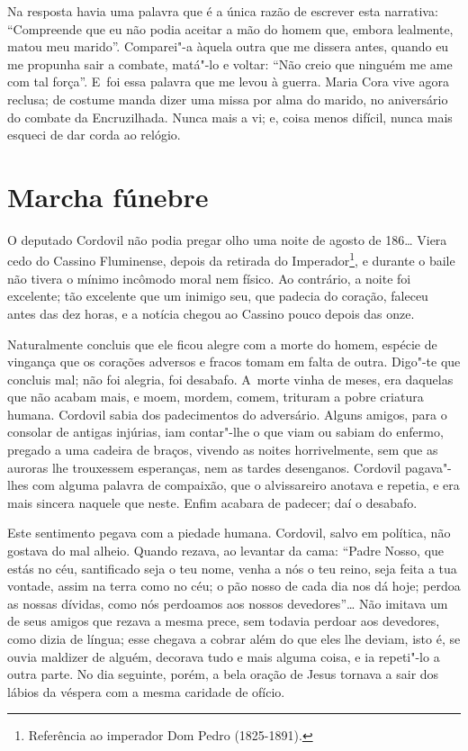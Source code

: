 Na resposta havia uma palavra que é a única razão de escrever esta
narrativa: ``Compreende que eu não podia aceitar a mão do homem que,
embora lealmente, matou meu marido''. Comparei"-a àquela outra que me
dissera antes, quando eu me propunha sair a combate, matá"-lo e voltar:
``Não creio que ninguém me ame com tal força''. E~foi essa palavra que
me levou à guerra. Maria Cora vive agora reclusa; de costume manda dizer
uma missa por alma do marido, no aniversário do combate da Encruzilhada.
Nunca mais a vi; e, coisa menos difícil, nunca mais esqueci de dar corda
ao relógio.

\chapter{Marcha fúnebre}

O deputado Cordovil não podia pregar olho uma noite de agosto de 186\ldots{}
Viera cedo do Cassino Fluminense, depois da retirada do
Imperador\footnote{Referência ao imperador Dom Pedro  (1825-1891).}, e
durante o baile não tivera o mínimo incômodo moral nem físico. Ao
contrário, a noite foi excelente; tão excelente que um inimigo seu, que
padecia do coração, faleceu antes das dez horas, e a notícia chegou ao
Cassino pouco depois das onze.

Naturalmente concluis que ele ficou alegre com a morte do homem, espécie
de vingança que os corações adversos e fracos tomam em falta de outra.
Digo"-te que concluis mal; não foi alegria, foi desabafo. A~morte vinha
de meses, era daquelas que não acabam mais, e moem, mordem, comem,
trituram a pobre criatura humana. Cordovil sabia dos padecimentos do
adversário. Alguns amigos, para o consolar de antigas injúrias, iam
contar"-lhe o que viam ou sabiam do enfermo, pregado a uma cadeira de
braços, vivendo as noites horrivelmente, sem que as auroras lhe
trouxessem esperanças, nem as tardes desenganos. Cordovil pagava"-lhes
com alguma palavra de compaixão, que o alvissareiro anotava e repetia, e
era mais sincera naquele que neste. Enfim acabara de padecer; daí o
desabafo.

Este sentimento pegava com a piedade humana. Cordovil, salvo em
política, não gostava do mal alheio. Quando rezava, ao levantar da cama:
``Padre Nosso, que estás no céu, santificado seja o teu nome, venha a
nós o teu reino, seja feita a tua vontade, assim na terra como no céu; o
pão nosso de cada dia nos dá hoje; perdoa as nossas dívidas, como nós
perdoamos aos nossos devedores''\ldots{} Não imitava um de seus amigos que
rezava a mesma prece, sem todavia perdoar aos devedores, como dizia de
língua; esse chegava a cobrar além do que eles lhe deviam, isto é, se
ouvia maldizer de alguém, decorava tudo e mais alguma coisa, e ia
repeti"-lo a outra parte. No dia seguinte, porém, a bela oração de Jesus
tornava a sair dos lábios da véspera com a mesma caridade de ofício.

